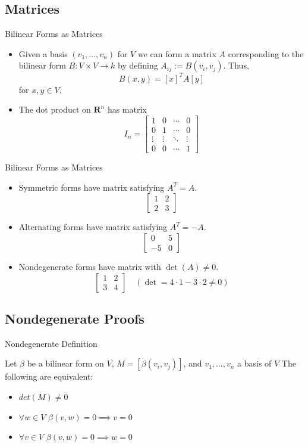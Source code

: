 \documentclass[svgnames]{beamer}
\newcommand{\R}{\mathbf{R}}
\begin{document}
\subsection{Matrices}
\begin{frame}{Bilinear Forms as Matrices}
\begin{itemize}[<+->]
    \item %
    Given a basis $(v_1, \dots, v_n)$ for $V$ we can form a matrix $A$ corresponding to the bilinear form $B: V \times V \to k$ by defining $A_{ij} := B(v_i, v_j)$. Thus,
    \[B(x,y) = [x]^TA[y]\]
    for $x,y \in V$. 
    \item The dot product on $\R^n$ has matrix \[
I_n = \begin{bmatrix}
1 & 0 & \cdots & 0 \\
0 & 1 & \cdots & 0 \\
\vdots & \vdots & \ddots & \vdots \\
0 & 0 & \cdots & 1
\end{bmatrix}
\]
\end{itemize}
\end{frame}
\begin{frame}{Bilinear Forms as Matrices}
\begin{itemize}[<+->]
    \item Symmetric forms have matrix satisfying $A^T=A$. 
       \[
    \begin{bmatrix}
    1 & 2 \\
    2 & 3
    \end{bmatrix}
    \]
    \item Alternating forms have matrix satisfying $A^T=-A$. 
        \[
    \begin{bmatrix}
    0 & 5 \\
    -5 & 0
    \end{bmatrix}
    \]
    \item Nondegenerate forms have matrix with $\det(A)\neq 0$. 
        \[
    \begin{bmatrix}
    1 & 2 \\
    3 & 4
    \end{bmatrix}
    \quad (\det = 4\cdot 1-3 \cdot 2\neq 0)
    \]
\end{itemize}
\end{frame}

\subsection{Nondegenerate Proofs}
\begin{frame}{Nondegenerate Definition}
\begin{Theorem}
Let $\beta$ be a bilinear form on $V$, $M=[\beta(v_i,v_j)]$, and $v_1, . . . , v_n$ a basis of $V$
The following are equivalent:
\begin{itemize}
    \item $det(M) \neq 0$
    \item $\forall w \in V $ $\beta (v,w) = 0 \implies v=0$
    \item $\forall v \in V $ $\beta (v,w) = 0 \implies w=0$
\end{itemize}
\end{Theorem}
\end{frame}
\end{document}
